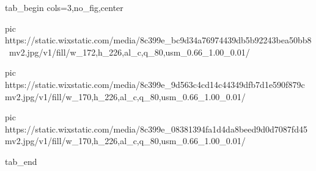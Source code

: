  
 
 
 
 


\ifcmt
  tab_begin cols=3,no_fig,center

     pic https://static.wixstatic.com/media/8c399e_bc9d34a76974439db5b92243bea50bb8~mv2.jpg/v1/fill/w_172,h_226,al_c,q_80,usm_0.66_1.00_0.01/%

		 pic https://static.wixstatic.com/media/8c399e_9d563c4cd14c44349dfb7d1e590f879c~mv2.jpg/v1/fill/w_170,h_226,al_c,q_80,usm_0.66_1.00_0.01/%

		 pic https://static.wixstatic.com/media/8c399e_08381394fa1d4da8beed9d0d7087fd45~mv2.jpg/v1/fill/w_170,h_226,al_c,q_80,usm_0.66_1.00_0.01/%

  tab_end
\fi
